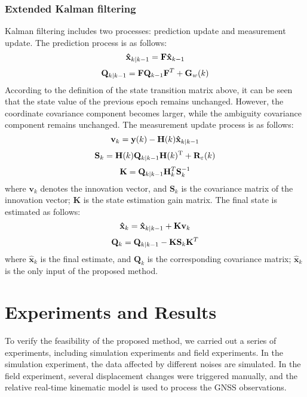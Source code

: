 \documentclass{svjour3}                     %
\begin{document}
\subsubsection{Extended Kalman filtering}
Kalman filtering includes two processes: prediction update and measurement update\citep{grewal2001kalman}. The prediction process is as follows:
\begin{equation}
{{\bf{\hat x}}_{k|k - 1}} = {\bf{F}}{{\bf{\hat x}}_{k - 1}}
\end{equation}
\begin{equation}
{{\bf{Q}}_{k|k - 1}} = {\bf{F}}{{\bf{Q}}_{k - 1}}{{\bf{F}}^T} + {{\bf{G}}_w}(k)
\end{equation}
According to the definition of the state transition matrix above, it can be seen that the state value of the previous epoch remains unchanged. However, the coordinate covariance component becomes larger, while the ambiguity covariance component remains unchanged. The measurement update process is as follows:
\begin{equation}
{{\bf{v}}_k} = {\bf{y}}(k) - {\bf{H}}(k){{\bf{\hat x}}_{k|k - 1}}
\end{equation}
\begin{equation}
{{\bf{S}}_k} = {\bf{H}}(k){{\bf{Q}}_{k|k - 1}}{\bf{H}}{(k)^{\rm{T}}} + {{\bf{R}}_\varepsilon }(k)
\end{equation}
\begin{equation}
{\bf{K}} = {{\bf{Q}}_{k|k - 1}}{\bf{H}}_k^T{\bf{S}}_k^{ - 1}
\end{equation}
where ${{\mathbf{v}}_{k}}$ denotes the innovation vector, and ${{\mathbf{S}}_{k}}$ is the covariance matrix of the innovation vector; $\mathbf{K}$ is the state estimation gain matrix. The final state is estimated as follows:
\begin{equation}
{{\bf{\hat x}}_k} = {{\bf{\hat x}}_{k|k - 1}} + {\bf{K}}{{\bf{v}}_k}
\end{equation}
\begin{equation}
{{\bf{Q}}_k} = {{\bf{Q}}_{k|k - 1}} - {\bf{K}}{{\bf{S}}_k}{{\bf{K}}^T}
\end{equation}
where ${{\mathbf{\hat{x}}}_{k}}$ is the final estimate, and ${{\mathbf{Q}}_{k}}$ is the corresponding covariance matrix; ${{\mathbf{\hat{x}}}_{k}}$ is the only input of the proposed method.  

\section{Experiments and Results}
To verify the feasibility of the proposed method, we carried out a series of experiments, including simulation experiments and field experiments. In the simulation experiment, the data affected by different noises are simulated. In the field experiment, several displacement changes were triggered manually, and the relative real-time kinematic model is used to process the GNSS observations.
\end{document}
